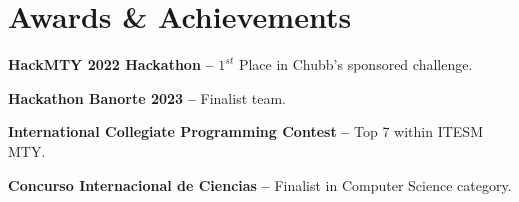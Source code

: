 \documentclass[letterpaper,11pt]{article}
\makeatletter
\newcommand{\resumeItem}[1]{
  \item\small{
    {#1 \vspace{-2pt}}
  }
}
\newcommand{\resumeProjectHeading}[2]{
    \vspace{-2pt}\item
    \begin{tabular*}{0.97\textwidth}{l@{\extracolsep{\fill}}r}
      \small#1 & #2 \\
    \end{tabular*}\vspace{-7pt}
}
\newcommand{\resumeSubHeadingListStart}{\begin{itemize}[leftmargin=0.15in, label={}]}
\newcommand{\resumeSubHeadingListEnd}{\end{itemize}}
\newcommand{\resumeItemListStart}{\begin{itemize}}
\newcommand{\resumeItemListEnd}{\end{itemize}\vspace{-5pt}}
\makeatother
\begin{document}
\section{Awards \& Achievements}
  \vspace{2pt}
  \resumeSubHeadingListStart
    \small{\item{
        \textbf{HackMTY 2022 Hackathon} \textbf{--} { $1^{st}$ Place in Chubb's sponsored challenge. } \\ \vspace{3pt}
        
	\textbf{Hackathon Banorte 2023} \textbf{--} { Finalist team. } \\ \vspace{3pt}
        
	\textbf{International Collegiate Programming Contest} \textbf{--} { Top 7 within ITESM MTY. }
        
	\textbf{Concurso Internacional de Ciencias} \textbf{--} { Finalist in Computer Science category.}
    }}
  \resumeSubHeadingListEnd




%       
%       



\end{document}
